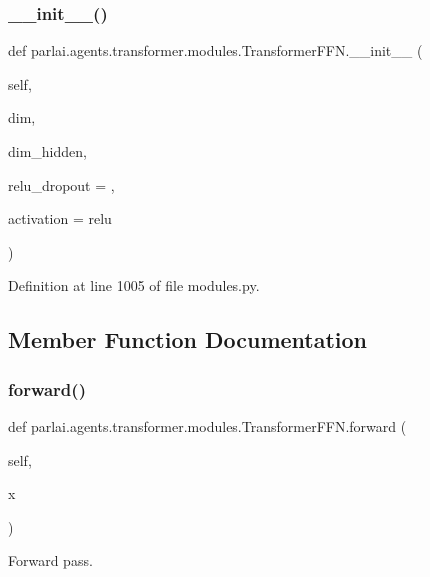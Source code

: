 \subsubsection{\texorpdfstring{\+\_\+\+\_\+init\+\_\+\+\_\+()}{\_\_init\_\_()}}
{\footnotesize\ttfamily def parlai.\+agents.\+transformer.\+modules.\+Transformer\+F\+F\+N.\+\_\+\+\_\+init\+\_\+\+\_\+ (\begin{DoxyParamCaption}\item[{}]{self,  }\item[{}]{dim,  }\item[{}]{dim\+\_\+hidden,  }\item[{}]{relu\+\_\+dropout = {},  }\item[{}]{activation = {\ttfamily \textquotesingle{}relu\textquotesingle{}} }\end{DoxyParamCaption})}



Definition at line 1005 of file modules.\+py.



\subsection{Member Function Documentation}
\mbox{\label{classparlai_1_1agents_1_1transformer_1_1modules_1_1TransformerFFN_a54f8d1ec7c0c4228f78a3be843ab3003}} 
\subsubsection{\texorpdfstring{forward()}{forward()}}
{\footnotesize\ttfamily def parlai.\+agents.\+transformer.\+modules.\+Transformer\+F\+F\+N.\+forward (\begin{DoxyParamCaption}\item[{}]{self,  }\item[{}]{x }\end{DoxyParamCaption})}

\begin{DoxyVerb}Forward pass.\end{DoxyVerb}
 

